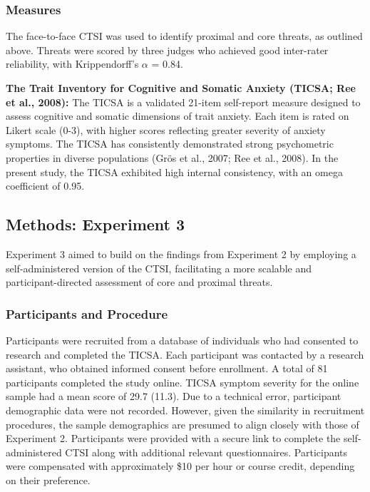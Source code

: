 \documentclass[
  man,floatsintext]{apa7}
\begin{document}
\subsubsection{Measures}\label{measures-2}

The face-to-face CTSI was used to identify proximal and core threats, as outlined above.
Threats were scored by three judges who achieved good inter-rater reliability, with Krippendorff's \(\alpha\) = 0.84.

\textbf{The Trait Inventory for Cognitive and Somatic Anxiety (TICSA; Ree et al., 2008):}
The TICSA is a validated 21-item self-report measure designed to assess cognitive and somatic dimensions of trait anxiety.
Each item is rated on Likert scale (0-3), with higher scores reflecting greater severity of anxiety symptoms.
The TICSA has consistently demonstrated strong psychometric properties in diverse populations (Grös et al., 2007; Ree et al., 2008).
In the present study, the TICSA exhibited high internal consistency, with an omega coefficient of 0.95.

\subsection{Methods: Experiment 3}\label{methods-experiment-3}

Experiment 3 aimed to build on the findings from Experiment 2 by employing a self-administered version of the CTSI, facilitating a more scalable and participant-directed assessment of core and proximal threats.

\subsubsection{Participants and Procedure}\label{participants-and-procedure}

Participants were recruited from a database of individuals who had consented to research and completed the TICSA.
Each participant was contacted by a research assistant, who obtained informed consent before enrollment.
A total of 81 participants completed the study online.
TICSA symptom severity for the online sample had a mean score of 29.7 (11.3).
Due to a technical error, participant demographic data were not recorded.
However, given the similarity in recruitment procedures, the sample demographics are presumed to align closely with those of Experiment 2.
Participants were provided with a secure link to complete the self-administered CTSI along with additional relevant questionnaires.
Participants were compensated with approximately \$10 per hour or course credit, depending on their preference.
\end{document}
